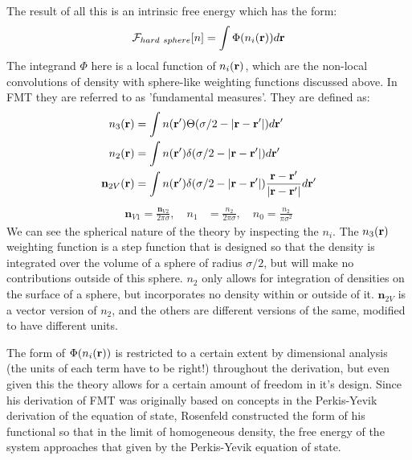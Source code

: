 The result of all this is an intrinsic free energy which has the form:
\begin{align}
  \label{eq:F-FMT-form}
  \mathcal{F}_{hard~sphere}[n] = \int \Phi({n_i(\textbf{r})})d\textbf{r}
\end{align}
The integrand $\Phi$ here is a local function of $n_i(\textbf{r})$, which are
the non-local convolutions of density with sphere-like weighting
functions discussed above.  In FMT they are referred to as
'fundamental measures'.  They are defined as:
\begin{align}
  n_3(\textbf{r}) &= \int n(\textbf{r}') \Theta(\sigma/2 -\left|\textbf{r} - \textbf{r}'\right|)
  d\textbf{r}' \label{eq:FMn3} \\
  n_2(\textbf{r}) &= \int n(\textbf{r}') \delta(\sigma/2 -\left|\textbf{r} - \textbf{r}'\right|) d\textbf{r}' \\
  \mathbf{n}_{2V}(\textbf{r}) &= \int n(\textbf{r}') \delta(\sigma/2 -\left|\textbf{r} - \textbf{r}'\right|) \frac{\textbf{r}-\textbf{r}'}{|\textbf{r}-\textbf{r}'|}d\textbf{r}'
\end{align}
\begin{align}
  \mathbf{n}_{V1} = \frac{\mathbf{n}_{V2}}{2\pi \sigma}, \quad
  n_1 &= \frac{n_2}{2\pi \sigma} , \quad
  n_0 = \frac{n_2}{\pi \sigma^2} \label{eq:FMrest}
\end{align}
We can see the spherical nature of the theory by inspecting the $n_i$.
The $n_3(\textbf{r})$ weighting function is a step function that is designed
so that the density is integrated over the volume of a sphere of
radius $\sigma/2$, but will make no contributions outside of this
sphere.  $n_2$ only allows for integration of densities on the surface
of a sphere, but incorporates no density within or outside of it.
$\mathbf{n}_{2V}$ is a vector version of $n_2$, and the others are different
versions of the same, modified to have different units.

The form of $\Phi({n_i(\textbf{r})})$ is restricted to a certain extent by
dimensional analysis (the units of each term have to be right!)
throughout the derivation, but even given this the theory allows for a
certain amount of freedom in it's design.  Since his derivation of FMT
was originally based on concepts in the Perkis-Yevik derivation of the
equation of state, Rosenfeld constructed the form of his functional so
that in the limit of homogeneous density, the free energy of the
system approaches that given by the Perkis-Yevik equation of state.

